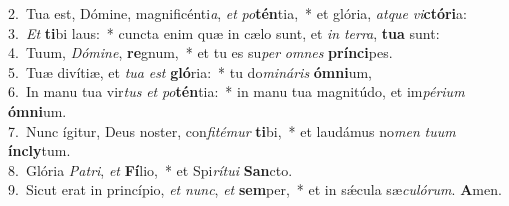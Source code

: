 {2.~}Tua est, Dómine, magnificénti\textit{a}, \textit{et} \textit{po}\textbf{tén}tia,~* et glória, \textit{at}\textit{que} \textit{vi}\textbf{ctó}\textbf{ri}a:\\
{3.~}\textit{Et} \textbf{ti}bi laus:~* cuncta enim quæ in cælo sunt, et \textit{in} \textit{ter}\textit{ra}, \textbf{tu}\textbf{a} sunt:\\
{4.~}Tuum, \textit{Dó}\textit{mi}\textit{ne}, \textbf{re}gnum,~* et tu es su\textit{per} \textit{om}\textit{nes} \textbf{prín}\textbf{ci}pes.\\
{5.~}Tuæ divítiæ, et \textit{tu}\textit{a} \textit{est} \textbf{gló}ria:~* tu do\textit{mi}\textit{ná}\textit{ris} \textbf{óm}\textbf{ni}um,\\
{6.~}In manu tua vir\textit{tus} \textit{et} \textit{po}\textbf{tén}tia:~* in manu tua magnitúdo, et im\textit{pé}\textit{ri}\textit{um} \textbf{óm}\textbf{ni}um.\\
{7.~}Nunc ígitur, Deus noster, con\textit{fi}\textit{té}\textit{mur} \textbf{ti}bi,~* et laudámus no\textit{men} \textit{tu}\textit{um} \textbf{ín}\textbf{cly}tum.\\
{8.~}Glória \textit{Pa}\textit{tri}, \textit{et} \textbf{Fí}lio,~* et Spi\textit{rí}\textit{tu}\textit{i} \textbf{San}cto.\\
{9.~}Sicut erat in princípio, \textit{et} \textit{nunc}, \textit{et} \textbf{sem}per,~* et in sǽcula sæ\textit{cu}\textit{ló}\textit{rum}. \textbf{A}men.\\
